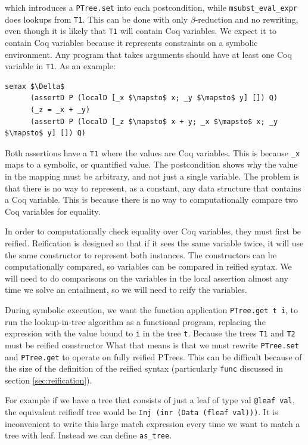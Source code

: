 \documentclass{puthesis}
\begin{document}
which introduces a \lstinline|PTree.set| into each postcondition,
while \lstinline|msubst_eval_expr| does lookups from
\lstinline|T1|. This can be done with only $\beta$-reduction and no
rewriting, even though it is likely that \lstinline|T1| will contain
Coq variables. We expect it to contain Coq variables because it
represents constraints on a symbolic environment. Any program that
takes arguments should have at least one Coq variable in
\lstinline|T1|. As an example:

\begin{lstlisting}
semax $\Delta$ 
      (assertD P (localD [_x $\mapsto$ x; _y $\mapsto$ y] []) Q) 
      (_z = _x + _y)
      (assertD P (localD [_z $\mapsto$ x + y; _x $\mapsto$ x; _y $\mapsto$ y] []) Q) 
\end{lstlisting}

Both assertions have a \lstinline|T1| where the values are Coq
variables. This is because \lstinline|_x| maps to a symbolic, or
quantified value.  The postcondition shows why the value in the
mapping must be arbitrary, and not just a single variable.  The
problem is that there is no way to represent, as a constant, any data
structure that contains a Coq variable. This is because there is no
way to computationally compare two Coq variables for equality.

In order to computationally check equality over Coq variables, they
must first be reified.  Reification is designed so that if it sees the
same variable twice, it will use the same constructor to represent
both instances. The constructors can be computationally compared, so
variables can be compared in reified syntax.  We will need to do
comparisons on the variables in the local assertion almost any time we
solve an entailment, so we will need to reify the variables.

During symbolic execution, we want the function application \lstinline|PTree.get t i|,
to run the lookup-in-tree algorithm as a functional
program, replacing the expression with the value bound to
\lstinline|i| in the tree \lstinline|t|. Because the trees
\lstinline|T1| and \lstinline|T2| must be reified constructor
What that means is that we must rewrite \lstinline|PTree.set| and
\lstinline|PTree.get| to operate on fully reified PTrees. 
 This can be
difficult because of the size of the definition of the reified syntax
(particularly \lstinline|func| discussed in section
\ref{sec:reification}). 

For example if we have a tree that consists of just a leaf of type val
\lstinline|@leaf val|, the equivalent reifiedf tree would be
\lstinline|Inj (inr (Data (fleaf val)))|. It is inconvenient to write
this large match expression every time we want to match a tree with
leaf. Instead we can define \lstinline|as_tree|.
\end{document}
